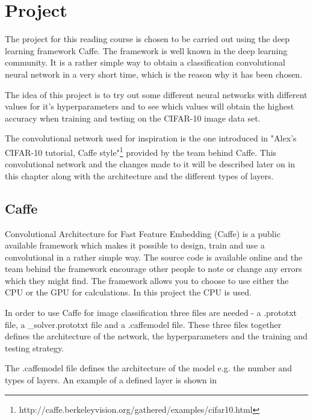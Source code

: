 \graphicspath{{Chapters/Project/}}

\chapter{Project}

The project for this reading course is chosen to be carried out using the deep learning framework Caffe. The framework is well known in the deep learning community. It is a rather simple way to obtain a classification convolutional neural network in a very short time, which is the reason why it has been chosen.

The idea of this project is to try out some different neural networks with different values for it's hyperparameters and to see which values will obtain the highest accuracy when training and testing on the CIFAR-10 image data set.

The convolutional network used for inspiration is the one introduced in "Alex's CIFAR-10 tutorial, Caffe style"\footnote{http://caffe.berkeleyvision.org/gathered/examples/cifar10.html} provided by the team behind Caffe. This convolutional network and the changes made to it will be described later on in this chapter along with the architecture and the different types of layers.

\section{Caffe} %
\label{sec:caffe}

Convolutional Architecture for Fast Feature Embedding (Caffe) is a public available framework which makes it possible to design, train and use a convolutional in a rather simple way. The source code is available online and the team behind the framework encourage other people to note or change any errors which they might find. The framework allows you to choose to use either the CPU or the GPU for calculations. In this project the CPU is used.



In order to use Caffe for image classification three files are needed - a .prototxt file, a \_solver.prototxt file and a .caffemodel file. These three files together defines the architecture of the network, the hyperparameters and the training and testing strategy.

The .caffemodel file defines the architecture of the model e.g. the number and types of layers. An example of a defined layer is shown in

